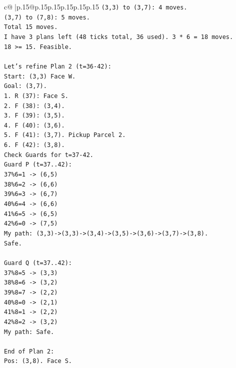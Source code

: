 \documentclass{article}
\begin{document}
{\begin{supertabular}{c@{$\;$}|p{.15\linewidth}@{}p{.15\linewidth}p{.15\linewidth}p{.15\linewidth}p{.15\linewidth}p{.15\linewidth}}
{{{\texttt{(3,3) to (3,7): 4 moves.} \\
\texttt{(3,7) to (7,8): 5 moves.} \\
\texttt{Total 15 moves.} \\
\texttt{I have 3 plans left (48 ticks total, 36 used). 3 * 6 = 18 moves.} \\
\texttt{18 >= 15. Feasible.} \\
\\ 
\texttt{Let's refine Plan 2 (t=36{-}42):} \\
\texttt{Start: (3,3) Face W.} \\
\texttt{Goal: (3,7).} \\
\texttt{1. R (37): Face S.} \\
\texttt{2. F (38): (3,4).} \\
\texttt{3. F (39): (3,5).} \\
\texttt{4. F (40): (3,6).} \\
\texttt{5. F (41): (3,7). Pickup Parcel 2.} \\
\texttt{6. F (42): (3,8).} \\
\texttt{Check Guards for t=37{-}42.} \\
\texttt{Guard P (t=37..42):} \\
\texttt{37\%6=1 {-}> (6,5)} \\
\texttt{38\%6=2 {-}> (6,6)} \\
\texttt{39\%6=3 {-}> (6,7)} \\
\texttt{40\%6=4 {-}> (6,6)} \\
\texttt{41\%6=5 {-}> (6,5)} \\
\texttt{42\%6=0 {-}> (7,5)} \\
\texttt{My path: (3,3){-}>(3,3){-}>(3,4){-}>(3,5){-}>(3,6){-}>(3,7){-}>(3,8).} \\
\texttt{Safe.} \\
\\ 
\texttt{Guard Q (t=37..42):} \\
\texttt{37\%8=5 {-}> (3,3)} \\
\texttt{38\%8=6 {-}> (3,2)} \\
\texttt{39\%8=7 {-}> (2,2)} \\
\texttt{40\%8=0 {-}> (2,1)} \\
\texttt{41\%8=1 {-}> (2,2)} \\
\texttt{42\%8=2 {-}> (3,2)} \\
\texttt{My path: Safe.} \\
\\ 
\texttt{End of Plan 2:} \\
\texttt{Pos: (3,8). Face S.} \\
}}}
\end{supertabular}}
\end{document}
